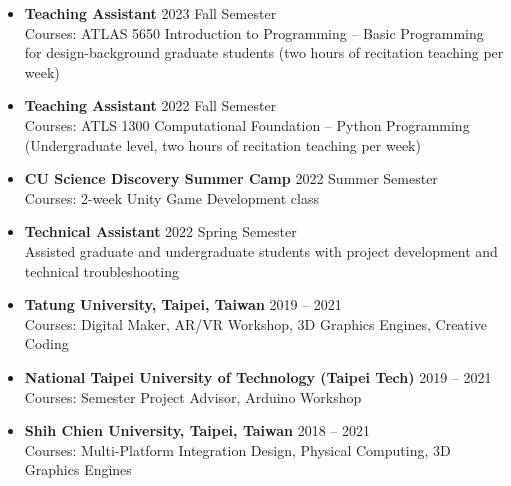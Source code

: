 \begin{itemize}

    \item \textbf{Teaching Assistant} \hfill 2023 Fall Semester \\ 
    Courses: ATLAS 5650 Introduction to Programming -- Basic Programming for design-background graduate students (two hours of recitation teaching per week)

    \item \textbf{Teaching Assistant} \hfill 2022 Fall Semester \\ 
    Courses: ATLS 1300 Computational Foundation -- Python Programming (Undergraduate level, two hours of recitation teaching per week)

    \item \textbf{CU Science Discovery Summer Camp} \hfill 2022 Summer Semester \\ 
    Courses: 2-week Unity Game Development class

    \item \textbf{Technical Assistant} \hfill 2022 Spring Semester \\ 
    Assisted graduate and undergraduate students with project development and technical troubleshooting

    \item \textbf{Tatung University, Taipei, Taiwan} \hfill 2019 -- 2021 \\
    Courses: Digital Maker, AR/VR Workshop, 3D Graphics Engines, Creative Coding

    \item \textbf{National Taipei University of Technology (Taipei Tech)} \hfill 2019 -- 2021 \\
    Courses: Semester Project Advisor, Arduino Workshop

    \item \textbf{Shih Chien University, Taipei, Taiwan} \hfill 2018 -- 2021 \\
    Courses: Multi-Platform Integration Design, Physical Computing, 3D Graphics Engines

\end{itemize}